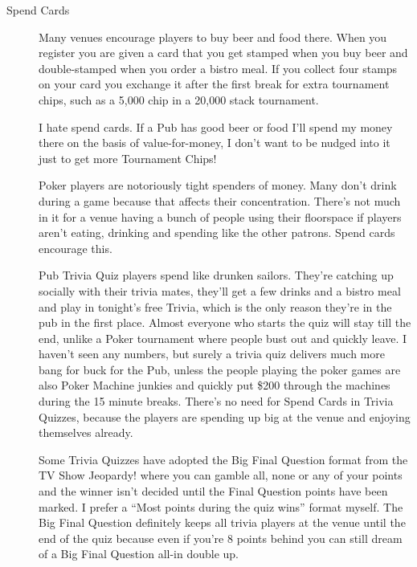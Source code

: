 \begin{description}

\item[Spend Cards] Many venues encourage players to buy beer and food
there. When you register you are given a card that you get stamped
when you buy beer and double-stamped when you order a bistro meal. If
you collect four stamps on your card you exchange it after the first
break for extra tournament chips, such as a 5,000 chip in a 20,000
stack tournament.

I hate spend cards. If a Pub has good beer or food I'll spend my money
there on the basis of value-for-money, I don't want to be nudged into
it just to get more Tournament Chips!

Poker players are notoriously tight spenders of money.
Many don't drink during a game because that affects their concentration.
There's not much in it for a venue having a bunch of people using
their floorspace if players aren't eating, drinking and spending like
the other patrons. Spend cards encourage this.

Pub Trivia Quiz players spend like drunken sailors. They're catching
up socially with their trivia mates, they'll get a few drinks and a
bistro meal and play in tonight's free Trivia, which is the only
reason they're in the pub in the first place. Almost everyone who
starts the quiz will stay till the end, unlike a Poker tournament
where people bust out and quickly leave. I haven't seen any numbers,
but surely a trivia quiz delivers much more bang for buck for the
Pub, unless the people playing the poker games are also Poker Machine
junkies and quickly put \$200 through the machines during the 15 minute
breaks. There's no need for Spend Cards in Trivia Quizzes, because the
players are spending up big at the venue and enjoying themselves already.


Some Trivia Quizzes have adopted
the Big Final Question format from the TV Show Jeopardy! where you can
gamble all, none or any of your points and the winner isn't decided
until the Final Question points have been marked. I prefer a ``Most
points during the quiz wins'' format myself. The Big Final Question
definitely keeps all trivia players at the venue until the end of the
quiz because even if you're 8 points behind you can still dream of a
Big Final Question all-in double up.


\end{description}
